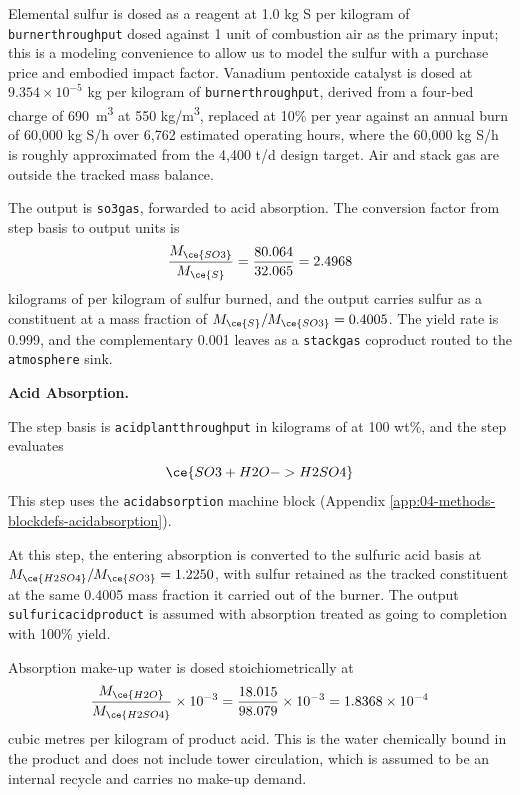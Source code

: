 \documentclass{article}
\renewcommand\_{\textunderscore\allowbreak}
\begin{document}
Elemental sulfur is dosed as a reagent at 1.0 kg S per kilogram of \texttt{burner\_throughput} dosed against 1 unit of combustion air as the primary input; this is a modeling convenience to allow us to model the sulfur with a purchase price and embodied impact factor. Vanadium pentoxide catalyst is dosed at $9.354 \times 10^{-5}$ kg per kilogram of \texttt{burner\_throughput}, derived from a four-bed charge of 690~\si{m^3} at 550 \si{kg/m^3}, replaced at 10\% per year against an annual burn of 60,000 kg S/h over 6,762 estimated operating hours, where the 60,000 kg S/h is roughly approximated from the 4,400 t/d  design target. Air and stack gas are outside the tracked mass balance.

The output is \texttt{so3\_gas}, forwarded to acid absorption. The conversion factor from step basis to output units is
\[
    \frac{M_{\ce{SO3}}}{M_{\ce{S}}} = \frac{80.064}{32.065} = 2.4968
\]
kilograms of  per kilogram of sulfur burned, and the output carries sulfur as a constituent at a mass fraction of $M_{\ce{S}}/M_{\ce{SO3}} = 0.4005$. The yield rate is 0.999\cite{davenportSulfuricAcidManufacture2006}, and the complementary 0.001 leaves as a \texttt{stack\_gas} coproduct routed to the \texttt{atmosphere} sink.

\medskip
\noindent\textbf{Acid Absorption.}\quad
 
The step basis is \texttt{acid\_plant\_throughput} in kilograms of  at 100 wt\%, and the step evaluates
\begin{equation}
    \ce{SO3 + H2O -> H2SO4}
\end{equation}
This step uses the \texttt{acid\_absorption} machine block (Appendix \ref{app:04-methods-blockdefs-acidabsorption}).
 
At this step, the  entering absorption is converted to the sulfuric acid basis at $M_{\ce{H2SO4}}/M_{\ce{SO3}} = 1.2250$, with sulfur retained as the tracked constituent at the same 0.4005 mass fraction it carried out of the burner. The output \texttt{sulfuric\_acid\_product} is assumed with absorption treated as going to completion with 100\% yield. 

Absorption make-up water is dosed stoichiometrically at
\[
    \frac{M_{\ce{H2O}}}{M_{\ce{H2SO4}}} \times 10^{-3} = \frac{18.015}{98.079} \times 10^{-3} = 1.8368 \times 10^{-4}
\]
cubic metres per kilogram of product acid. This is the water chemically bound in the product and does not include tower circulation, which is assumed to be an internal recycle and carries no make-up demand.
\end{document}
